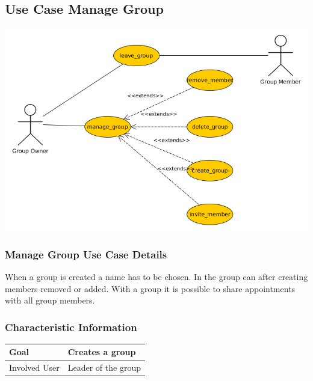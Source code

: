 \documentclass[12pt]{scrartcl}
\begin{document}
    \subsection{Use Case Manage Group} 
        \includegraphics[scale=.5]{Materials/Images/manage_group_use_case.png}
    \subsubsection{Manage Group Use Case Details} 
        When a group is created a name has to be chosen. 
        In the group can after creating members removed or added. With a group it is possible to share appointments 
        with all group members.
    \subsubsection{Characteristic Information} 
        \begin{tabular}{|l|l|}
            \hline
            Goal & Creates a group \\ \hline
            Involved User & Leader of the group \\ \hline
        \end{tabular}
\end{document}
